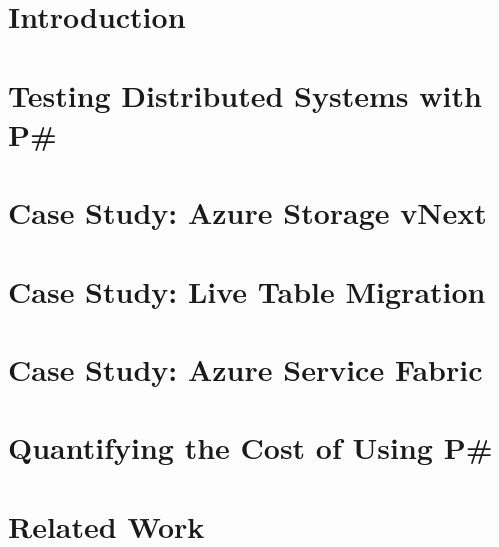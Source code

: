 \documentclass[letterpaper,twocolumn,10pt]{article}
\newcommand{\psharp}{P\#\xspace}
\begin{document}
\section{Introduction}
\label{sec:intro}



%
%

\section{Testing Distributed Systems with \psharp}
\label{sec:overview}



\vspace{-1mm}
\section{Case Study: Azure Storage vNext}
\label{sec:vnext}
\vspace{-1mm}



\section{Case Study: Live Table Migration}
\label{sec:migrating}



\section{Case Study: Azure Service Fabric}
\label{sec:fabric}



\section{Quantifying the Cost of Using \psharp}
\label{sec:eval}



\section{Related Work}
\label{sec:rw}
\end{document}
